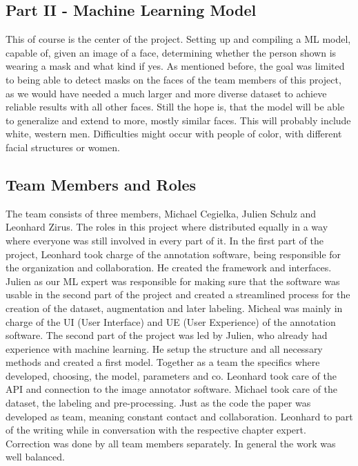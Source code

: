 \subsection{Part II - Machine Learning Model}

This of course is the center of the project. Setting up and compiling a ML
model, capable of, given an image of a face, determining whether the
person shown is wearing a mask and what kind if yes.
\newline
As mentioned before, the goal was limited to being able to detect masks on the
faces of the team members of this project, as we would have needed a much larger
and more diverse dataset to achieve reliable results with all other faces. Still
the hope is, that the model will be able to generalize and extend to more, 
mostly similar faces. This will probably include white, western
men. Difficulties might occur with people of color, with different facial structures or women.

\subsection{Team Members and Roles}

The team consists of three members, Michael Cegielka, Julien Schulz and Leonhard
Zirus. The roles in this project where distributed equally in a way where
everyone was still involved in every part of it. 
\newline
In the first part of the project, Leonhard took charge of the annotation
software, being responsible for the organization and collaboration. He created
the framework and interfaces. Julien as our ML expert was responsible for making
sure that the software was usable in the second part of the project and created
a streamlined process for the creation of the dataset, augmentation and later
labeling. Micheal was mainly in charge of the UI (User Interface) and UE (User
Experience) of the annotation software. 
\newline
The second part of the project was led by Julien, who already had experience
with machine learning. He setup the structure and all necessary methods and
created a first model. Together as a team the specifics where developed,
choosing, the model, parameters and co. Leonhard took care of the API and
connection to the image annotator software. Michael took care of the dataset,
the labeling and pre-processing.
\newline
Just as the code the paper was developed as team, meaning constant contact and
collaboration. Leonhard to part of the writing while in conversation with the
respective chapter expert. Correction was done by all team members separately.
In general the work was well balanced.